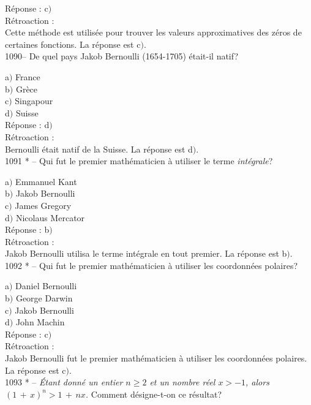 ﻿\documentclass[letterpaper, 12pt]{article}
\begin{document}
R\'eponse : c$)$\\

R\'etroaction : \\
Cette m\'ethode est utilis\'ee pour trouver les valeurs
approximatives des z\'eros de certaines fonctions. La r\'eponse est
c$)$.\\

1090-- De quel pays Jakob Bernoulli (1654-1705) \'etait-il natif?

a$)$ France  \\
b$)$ Gr\`ece  \\
c$)$ Singapour \\
d$)$ Suisse\\

R\'eponse : d$)$\\

R\'etroaction : \\
Bernoulli \'etait natif de la Suisse.
La r\'eponse est d$)$.\\

1091 * -- Qui fut le premier math\'ematicien \`a utiliser le terme
{\sl int\'egrale}?

a$)$ Emmanuel Kant \\
b$)$ Jakob Bernoulli  \\
c$)$ James Gregory  \\
d$)$ Nicolaus Mercator\\

R\'eponse : b$)$\\

R\'etroaction : \\
Jakob Bernoulli utilisa le terme int\'egrale en tout premier.
La r\'eponse est b$)$.\\

1092 * -- Qui fut le premier math\'ematicien \`a utiliser les
coordonn\'ees polaires?

a$)$ Daniel Bernoulli \\
b$)$ George Darwin  \\
c$)$ Jakob Bernoulli  \\
d$)$ John Machin\\

R\'eponse : c$)$\\

R\'etroaction : \\
Jakob Bernoulli fut le premier math\'ematicien \`a utiliser les
coordonn\'ees polaires.
La r\'eponse est c$)$.\\

1093 * -- {\sl \'Etant donn\'e un entier $n\ge2$ et un nombre r\'eel
$x>-1$, alors $(1\,+\,x)^n>1\,+\,nx$.} Comment d\'esigne-t-on ce
r\'esultat?
\end{document}
